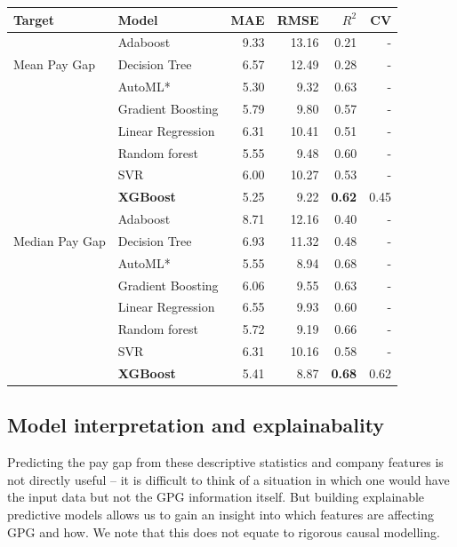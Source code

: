 \begin{centering}
    \scriptsize{
    \label{tab:model-comparison-table}
    \begin{tabular*}{\linewidth}{l|l|r|r|r|r} \hline
        Target & Model & MAE & RMSE & $R^2$ & CV \\ \hline
        \multirow{3}{4em}{Mean Pay Gap}
& Adaboost & 9.33 & 13.16 & 0.21 & - \\
& Decision Tree & 6.57 & 12.49 & 0.28& -  \\
& AutoML* & 5.30 & 9.32 & 0.63& -  \\
& Gradient Boosting & 5.79 & 9.80 & 0.57& -  \\
& Linear Regression & 6.31 & 10.41 & 0.51& -  \\
& Random forest & 5.55 & 9.48 & 0.60& -  \\
& SVR & 6.00 & 10.27 & 0.53& -  \\
& {\bf XGBoost} & 5.25 & 9.22 & {\bf 0.62} & 0.45  \\ \hline
        \multirow{3}{4em}{Median Pay Gap}
& Adaboost & 8.71 & 12.16 & 0.40 & -  \\
& Decision Tree & 6.93 & 11.32 & 0.48  & -\\
& AutoML* & 5.55 & 8.94 & 0.68 & - \\
& Gradient Boosting & 6.06 & 9.55 & 0.63  & -\\
& Linear Regression & 6.55 & 9.93 & 0.60 & - \\
& Random forest & 5.72 & 9.19 & 0.66 & - \\
& SVR & 6.31 & 10.16 & 0.58 & - \\
& {\bf XGBoost} & 5.41 & 8.87 & {\bf 0.68} & 0.62\\ \hline
    \end{tabular*}}
\end{centering}



\subsection{Model interpretation and explainabality}
Predicting the pay gap from these descriptive statistics and company features is
not directly useful -- it is difficult to think of a situation in which one would have the input data but not the GPG information itself. But building explainable predictive models allows us to gain an insight into which features are affecting GPG and how. We note that this does not equate to rigorous causal modelling.

